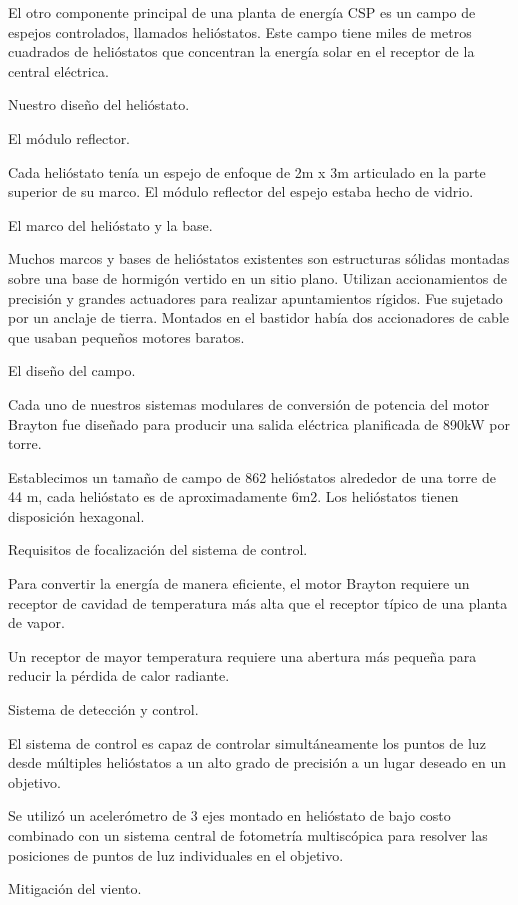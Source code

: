 \documentclass[12pt]{article}
\begin{document}
El otro componente principal de una planta de energía CSP es un campo de espejos controlados, llamados helióstatos. Este campo tiene miles de metros cuadrados de helióstatos que concentran la energía solar en el receptor de la central eléctrica.

Nuestro diseño del helióstato.

El módulo reflector.

Cada helióstato tenía un espejo de enfoque de 2m x 3m articulado en la parte superior de su marco. El módulo reflector del espejo estaba hecho de vidrio.

El marco del helióstato y la base.

Muchos marcos y bases de helióstatos existentes son estructuras sólidas montadas sobre una base de hormigón vertido en un sitio plano. Utilizan accionamientos de precisión y grandes actuadores para realizar apuntamientos rígidos. Fue sujetado por un anclaje de tierra. Montados en el bastidor había dos accionadores de cable que usaban pequeños motores baratos.

El diseño del campo.

Cada uno de nuestros sistemas modulares de conversión de potencia del motor Brayton fue diseñado para producir una salida eléctrica planificada de 890kW por torre.

Establecimos un tamaño de campo de 862 helióstatos alrededor de una torre de 44 m, cada helióstato es de aproximadamente 6m2. Los helióstatos tienen disposición hexagonal.

Requisitos de focalización del sistema de control.

Para convertir la energía de manera eficiente, el motor Brayton requiere un receptor de cavidad de temperatura más alta que el receptor típico de una planta de vapor.

Un receptor de mayor temperatura requiere una abertura más pequeña para reducir la pérdida de calor radiante.

Sistema de detección y control.

El sistema de control es capaz de controlar simultáneamente los puntos de luz desde múltiples helióstatos a un alto grado de precisión a un lugar deseado en un objetivo.

Se utilizó un acelerómetro de 3 ejes montado en helióstato de bajo costo combinado con un sistema central de fotometría multiscópica para resolver las posiciones de puntos de luz individuales en el objetivo.

Mitigación del viento.
\end{document}

